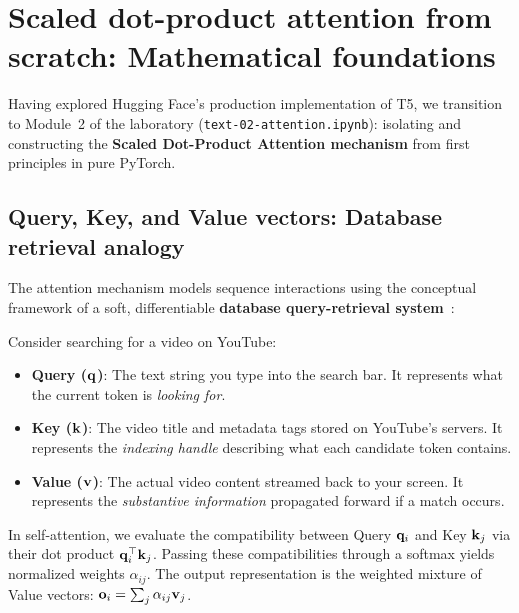 \documentclass[../labs.tex]{subfiles}
\begin{document}
\section{Scaled dot-product attention from scratch: Mathematical foundations}
\label{sec:lab02_scaled_dot_attention}

Having explored Hugging Face's production implementation of T5, we transition to Module~2 of the laboratory (\texttt{text-02-attention.ipynb}): isolating and constructing the \textbf{Scaled Dot-Product Attention mechanism} from first principles in pure PyTorch.

\subsection{Query, Key, and Value vectors: Database retrieval analogy}

The attention mechanism models sequence interactions using the conceptual framework of a soft, differentiable \textbf{database query-retrieval system}~\cite{vaswani2017}:

\begin{intuition}
Consider searching for a video on YouTube:
\begin{itemize}
    \item \textbf{Query ($\mathbf{q}$)}: The text string you type into the search bar. It represents what the current token is \textit{looking for}.
    \item \textbf{Key ($\mathbf{k}$)}: The video title and metadata tags stored on YouTube's servers. It represents the \textit{indexing handle} describing what each candidate token contains.
    \item \textbf{Value ($\mathbf{v}$)}: The actual video content streamed back to your screen. It represents the \textit{substantive information} propagated forward if a match occurs.
\end{itemize}
In self-attention, we evaluate the compatibility between Query $\mathbf{q}_i$ and Key $\mathbf{k}_j$ via their dot product $\mathbf{q}_i^\top \mathbf{k}_j$. Passing these compatibilities through a softmax yields normalized weights $\alpha_{ij}$. The output representation is the weighted mixture of Value vectors: $\mathbf{o}_i = \sum_j \alpha_{ij} \mathbf{v}_j$.
\end{intuition}
\end{document}
